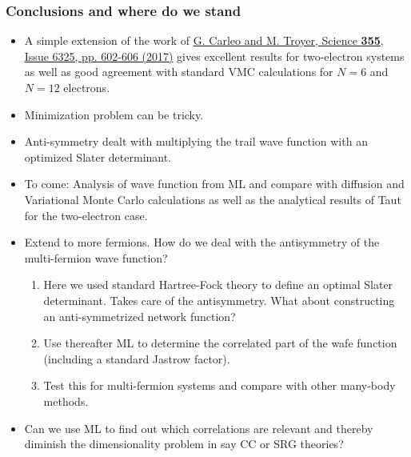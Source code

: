 \documentclass{beamer}
\begin{document}
\begin{frame}
\frametitle{Conclusions and where do we stand}

\begin{block}{}
\begin{itemize}
\item A simple extension of the work of \href{{http://science.sciencemag.org/content/355/6325/602}}{G. Carleo and M. Troyer, Science \textbf{355}, Issue 6325, pp. 602-606 (2017)} gives excellent results for two-electron systems as well as good agreement with standard VMC calculations for $N=6$ and $N=12$ electrons.

\item Minimization problem can be tricky.

\item Anti-symmetry dealt with multiplying the trail wave function with an optimized Slater determinant.

\item To come: Analysis of wave function from ML and compare with diffusion and Variational Monte Carlo calculations as well as the analytical results of Taut for the two-electron case.

\item Extend to more fermions. How do we deal with the antisymmetry of the multi-fermion wave function?
\begin{enumerate}

 \item Here we used standard Hartree-Fock theory to define an optimal Slater determinant. Takes care of the antisymmetry. What about constructing an anti-symmetrized network function?

 \item Use thereafter ML to determine the correlated part of the wafe function (including a standard Jastrow factor).

 \item Test this for multi-fermion systems and compare with other many-body methods.

\end{enumerate}

\noindent
\item Can we use ML to find out which correlations are relevant and thereby diminish the dimensionality problem in say CC or SRG theories?
\end{itemize}

\noindent
\end{block}
\end{frame}
\end{document}

